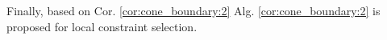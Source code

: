 \documentclass[letterpaper, 10 pt, conference]{ieeeconf}  %
\newtheorem{proposition}{\textbf{Proposition}}
\begin{document}
Finally, based on Cor. \ref{cor:cone_boundary:2} Alg. \ref{cor:cone_boundary:2} is proposed for local constraint selection. 
{\color{blue}
    

}
\end{document}
